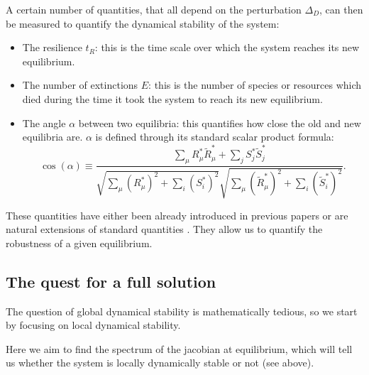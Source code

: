 \documentclass[12pt, titlepage]{report}
\begin{document}
A certain number of quantities, that all depend on the perturbation $\Delta_D$, can then be measured to quantify the dynamical stability of the system:
\begin{itemize}
  \item The resilience $t_R$: this is the time scale over which the system reaches its new equilibrium.
  \item The number of extinctions $E$: this is the number of species or resources which died during the time it took the system to reach its new equilibrium.
  \item The angle $\alpha$ between two equilibria: this quantifies how close the old and new equilibria are. $\alpha$ is defined through its standard scalar product formula:
  \begin{equation}
  \cos(\alpha) \equiv \frac{\sum_\mu R^*_\mu \tilde{R}^*_\mu + \sum_j S^*_j\tilde{S}^*_j}{\sqrt{\sum_\mu \left(R^*_\mu\right)^2 + \sum_i \left(S^*_i\right)^2}\sqrt{\sum_\mu \left(\tilde{R}^*_\mu\right)^2 + \sum_i \left(\tilde{S}^*_i\right)^2}}.
  \end{equation}
\end{itemize}
These quantities have either been already introduced in previous papers or are natural extensions of standard quantities \cite{ives_stability_2007,pascual-garcia_mutualism_2017}. They allow us to quantify the robustness of a given equilibrium.

\subsection{The quest for a full solution}
The question of global dynamical stability is mathematically tedious, so we start by focusing on local dynamical stability.

Here we aim to find the spectrum of the jacobian at equilibrium, which will tell us whether the system is locally dynamically stable or not (see above).
\end{document}
